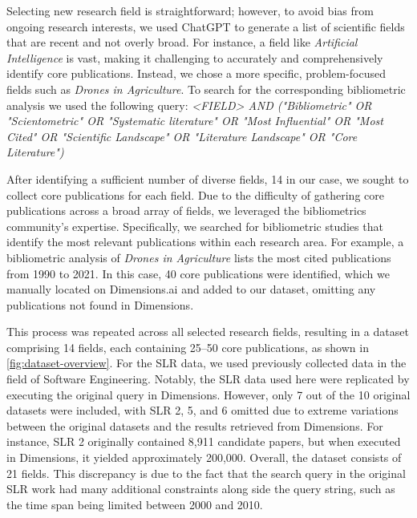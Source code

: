 Selecting new research field is straightforward; however, to avoid bias from ongoing research interests, we used ChatGPT to generate a list of scientific fields that are recent and not overly broad. For instance, a field like \textit{Artificial Intelligence} is vast, making it challenging to accurately and comprehensively identify core publications. Instead, we chose a more specific, problem-focused fields such as \textit{Drones in Agriculture}. To search for the corresponding bibliometric analysis we used the following query: \textit{<FIELD> AND ("Bibliometric" OR "Scientometric" OR "Systematic literature" OR "Most Influential" OR "Most Cited" OR "Scientific Landscape" OR "Literature Landscape" OR "Core Literature")} 


After identifying a sufficient number of diverse fields, 14 in our case, we sought to collect core publications for each field. Due to the difficulty of gathering core publications across a broad array of fields, we leveraged the bibliometrics community’s expertise. Specifically, we searched for bibliometric studies that identify the most relevant publications within each research area. For example, a bibliometric analysis of \textit{Drones in Agriculture} \autocite{Rejeb2022} lists the most cited publications from 1990 to 2021. In this case, 40 core publications were identified, which we manually located on Dimensions.ai and added to our dataset, omitting any publications not found in Dimensions.

This process was repeated across all selected research fields, resulting in a dataset comprising 14 fields, each containing 25–50 core publications, as shown in \autoref{fig:dataset-overview}. For the 
SLR data, we used previously collected data \autocite{badami2023adaptive} in the field of Software Engineering. Notably, the SLR data used here were replicated by executing the original query in Dimensions. However, only 7 out of the 10 original datasets were included, with SLR 2, 5, and 6 omitted due to extreme variations between the original datasets and the results retrieved from Dimensions. For instance, SLR 2 originally contained 8,911 candidate papers, but when executed in Dimensions, it yielded approximately 200,000. Overall, the dataset consists of 21 fields. This discrepancy is due to the fact that the search query in the original SLR work had many additional constraints along side the query string, such as the time span being limited between 2000 and 2010.


